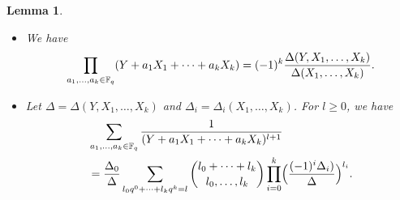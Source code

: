 \documentclass{amsart}
\newtheorem{lem}[thm]{Lemma}
\numberwithin{equation}{section}
\theoremstyle{definition}
\begin{document}
\begin{lem}\label{carlitz-formula}\
\begin{itemize}
\item[(i)] We have
\begin{equation}\label{moore-det}
\prod_{a_1,\dots,a_k\in\Bbb F_q}(Y+a_1X_1+\cdots+a_kX_k)=(-1)^{k}\frac{\Delta(Y,X_1,\dots,X_k)}{\Delta(X_1,\dots,X_k)}.
\end{equation}

\item[(ii)] Let $\Delta=\Delta(Y,X_1,\dots,X_k)$ and $\Delta_i=\Delta_i(X_1,\dots,X_k)$.
For $l\ge 0$, we have
\begin{align}\label{Car}
&\sum_{a_1,\dots,a_k\in\Bbb F_q}\frac 1{(Y+a_1X_1+\cdots+a_kX_k)^{l+1}}\\
&=\frac{\Delta_0}\Delta\sum_{l_0q^0+\cdots+l_kq^k=l}\binom{l_0+\cdots+l_k}{l_0,\dots,l_k}\prod_{i=0}^k\Bigl(\frac{(-1)^i\Delta_i)}\Delta\Bigr)^{l_i}.\nonumber
\end{align}
\end{itemize}
\end{lem}
\end{document}

